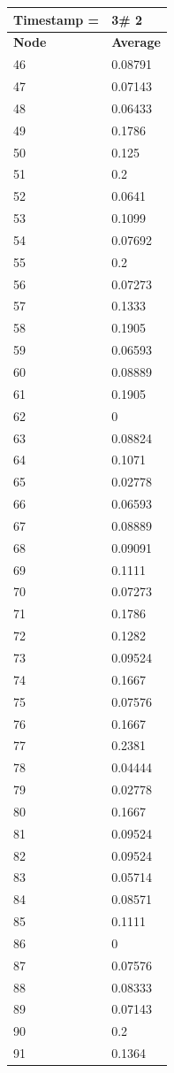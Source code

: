 \begin{tabular}{|l||l|}
\hline
\textbf{Timestamp =} & \textbf{3}\# 2\\\hline
	\textbf{Node} & \textbf{Average} \\ \hline
\hline
	46 & 0.08791 \\ \hline
	47 & 0.07143 \\ \hline
	48 & 0.06433 \\ \hline
	49 & 0.1786 \\ \hline
	50 & 0.125 \\ \hline
	51 & 0.2 \\ \hline
	52 & 0.0641 \\ \hline
	53 & 0.1099 \\ \hline
	54 & 0.07692 \\ \hline
	55 & 0.2 \\ \hline
	56 & 0.07273 \\ \hline
	57 & 0.1333 \\ \hline
	58 & 0.1905 \\ \hline
	59 & 0.06593 \\ \hline
	60 & 0.08889 \\ \hline
	61 & 0.1905 \\ \hline
	62 & 0 \\ \hline
	63 & 0.08824 \\ \hline
	64 & 0.1071 \\ \hline
	65 & 0.02778 \\ \hline
	66 & 0.06593 \\ \hline
	67 & 0.08889 \\ \hline
	68 & 0.09091 \\ \hline
	69 & 0.1111 \\ \hline
	70 & 0.07273 \\ \hline
	71 & 0.1786 \\ \hline
	72 & 0.1282 \\ \hline
	73 & 0.09524 \\ \hline
	74 & 0.1667 \\ \hline
	75 & 0.07576 \\ \hline
	76 & 0.1667 \\ \hline
	77 & 0.2381 \\ \hline
	78 & 0.04444 \\ \hline
	79 & 0.02778 \\ \hline
	80 & 0.1667 \\ \hline
	81 & 0.09524 \\ \hline
	82 & 0.09524 \\ \hline
	83 & 0.05714 \\ \hline
	84 & 0.08571 \\ \hline
	85 & 0.1111 \\ \hline
	86 & 0 \\ \hline
	87 & 0.07576 \\ \hline
	88 & 0.08333 \\ \hline
	89 & 0.07143 \\ \hline
	90 & 0.2 \\ \hline
	91 & 0.1364 \\ \hline
\end{tabular}
